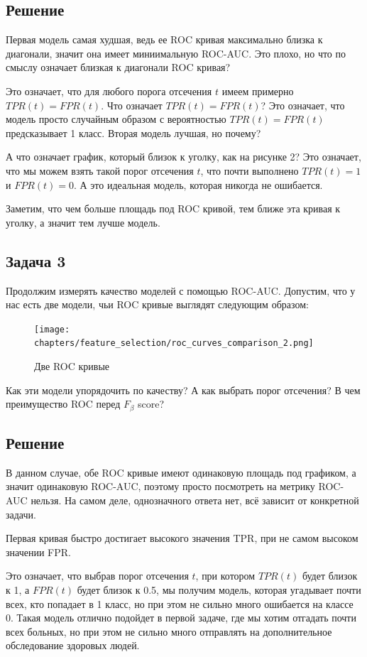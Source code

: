 \subsection*{Решение}
Первая модель самая худшая, ведь ее ROC кривая максимально близка к диагонали, значит она имеет миниимальную ROC-AUC.
Это плохо, но что по смыслу означает близкая к диагонали ROC кривая?

Это означает, что для любого порога отсечения $t$ имеем примерно $TPR(t) = FPR(t)$.
Что означает $TPR(t) = FPR(t)$? Это означает, что модель просто случайным образом с вероятностью $TPR(t)=FPR(t)$ предсказывает 1 класс.
Вторая модель лучшая, но почему?

А что означает график, который близок к уголку, как на рисунке 2?
Это означает, что мы можем взять такой порог отсечения $t$, что почти выполнено $TPR(t) = 1$ и $FPR(t) = 0$.
А это идеальная модель, которая никогда не ошибается.

Заметим, что чем больше площадь под ROC кривой, тем ближе эта кривая к уголку, а значит тем лучше модель.

\subsection*{Задача 3}
Продолжим измерять качество моделей с помощью ROC-AUC. Допустим, что у нас есть две модели, чьи ROC кривые выглядят следующим образом:
\begin{figure}[h]
    \centering
    \texttt{[image: chapters/feature\_selection/roc\_curves\_comparison\_2.png]}
    \caption{Две ROC кривые}
\end{figure}
Как эти модели упорядочить по качеству? А как выбрать порог отсечения? В чем преимущество ROC перед $F_{\beta}$ score?

\subsection*{Решение}
В данном случае, обе ROC кривые имеют одинаковую площадь под графиком, а значит одинаковую ROC-AUC, поэтому просто посмотреть на метрику ROC-AUC нельзя.
На самом деле, однозначного ответа нет, всё зависит от конкретной задачи.

Первая кривая быстро достигает высокого значения TPR, при не самом высоком значении FPR.

Это означает, что выбрав порог отсечения $t$, при котором $TPR(t)$ будет близок к 1, а $FPR(t)$ будет близок к 0.5, мы получим модель,
которая угадывает почти всех, кто попадает в 1 класс, но при этом не сильно много ошибается на классе 0.
Такая модель отлично подойдет в первой задаче, где мы хотим отгадать почти всех больных, но при этом не сильно много отправлять на дополнительное обследование здоровых людей.

